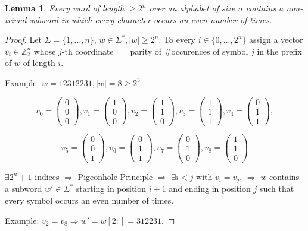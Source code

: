 \documentclass[12pt]{article}
\theoremstyle{plain} %
\newtheorem{lemma}[theorem]{Lemma}
\newcommand{\Z}{\mathbb{Z}} %
\newcommand{\set}[1]{\{#1\}}
\begin{document}
\begin{lemma}\label{lem:even-occurences}
    Every word of length \(\geq 2^n\) over an alphabet of size \(n\) contains a non-trivial subword in which every character occurs an even number of times.
\end{lemma}

\begin{proof}
Let \(\Sigma = \set{1, \ldots, n}\), \(w \in \Sigma^*, |w| \geq 2^n\). To every \(i \in \set{0, \ldots, 2^n}\) 
assign a vector \(v_i \in \Z_2^n\) whose \(j\)-th coordinate \(=\) parity of \#occurences of symbol \(j\) in the 
prefix of \(w\) of length \(i\).

Example:
\(w = 12312231, |w| = 8 \geq 2^3\)

\[ v_0 = \begin{pmatrix}
0 \\ 0 \\ 0
\end{pmatrix}, v_1 = \begin{pmatrix}
1 \\ 0 \\ 0
\end{pmatrix}, v_2 = \begin{pmatrix}
1 \\ 1 \\ 0
\end{pmatrix}, v_3 = \begin{pmatrix}
1 \\ 1 \\ 1
\end{pmatrix}, v_4 = \begin{pmatrix}
0 \\ 1 \\ 1
\end{pmatrix}, \]

\[ v_5 = \begin{pmatrix}
0 \\ 0 \\ 1
\end{pmatrix}, v_6 = \begin{pmatrix}
0 \\ 1 \\ 1
\end{pmatrix}, v_7 = \begin{pmatrix}
0 \\ 1 \\ 0
\end{pmatrix}, v_8 = \begin{pmatrix}
1 \\ 1 \\ 0
\end{pmatrix} \]

\(\exists 2^n + 1\) indices \(\Rightarrow\) Pigeonhole Principle \(\Rightarrow\)
\(\exists i < j\) with \(v_i = v_j\). \(\Rightarrow\) \(w\) contains a subword \(w' \in \Sigma^*\)
starting in position \(i + 1\) and ending in position \(j\) such that every symbol occurs an even number of times.

Example: \(v_2 = v_8 \Rightarrow w' = w[2:] = 312231\).
\end{proof}
\end{document}
